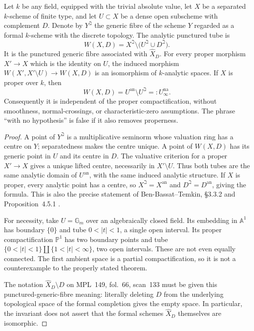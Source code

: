 Let $k$ be any field, equipped with the trivial absolute value, let $X$ be
a separated $k$-scheme of finite type, and let $U\subset X$ be a dense open
subscheme with complement $D$. Denote by $Y^{\beth}$ the generic fibre of
the scheme $Y$ regarded as a formal $k$-scheme with the discrete topology.
The analytic punctured tube is
\[
 W(X,D)=X^{\beth}\setminus\bigl(U^{\beth}\cup D^{\beth}\bigr).
\]
It is the punctured generic fibre associated with $\widehat X_D$.
For every proper morphism $X'\to X$ which is the identity on $U$, the
induced morphism $W(X',X'\setminus U)\to W(X,D)$ is an isomorphism of
$k$-analytic spaces. If $X$ is proper over $k$, then
\[
                 W(X,D)=U^{\mathrm{an}}\setminus U^{\beth}=:U_\infty^{\mathrm{na}}.
\]
Consequently it is independent of the proper compactification, without
smoothness, normal-crossings, or characteristic-zero assumptions. The
phrase ``with no hypothesis'' is false if it also removes properness.

\begin{proof}
A point of $Y^{\beth}$ is a multiplicative seminorm whose valuation ring
has a centre on $Y$; separatedness makes the centre unique. A point of
$W(X,D)$ has its generic point in $U$ and its centre in $D$. The valuative
criterion for a proper $X'\to X$ gives a unique lifted centre, necessarily
in $X'\setminus U$. Thus both tubes are the same analytic domain of
$U^{\mathrm{an}}$, with the same induced analytic structure. If $X$ is
proper, every analytic point has a centre, so $X^{\beth}=X^{\mathrm{an}}$
and $D^{\beth}=D^{\mathrm{an}}$, giving the formula. This is also the
precise statement of Ben-Bassat--Temkin, \S3.3.2 and Proposition~4.5.1
\cite{BenBassatTemkin2012}.

For necessity, take $U=\mathbb G_m$ over an algebraically closed field.
Its embedding in $\mathbb A^1$ has boundary $\{0\}$ and tube
$0<|t|<1$, a single open interval. Its proper compactification
$\mathbb P^1$ has two boundary points and tube
$\{0<|t|<1\}\amalg\{1<|t|<\infty\}$, two open intervals. These are not
even equally connected. The first ambient space is a partial
compactification, so it is not a counterexample to the properly stated
theorem.

The notation $\widehat X_D\setminus D$ on MPL~149, fol.~66, scan~133
must be given this punctured-generic-fibre meaning: literally deleting
$D$ from the underlying topological space of the formal completion gives
the empty space. In particular, the invariant does not assert that the
formal schemes $\widehat X_D$ themselves are isomorphic.
\end{proof}

